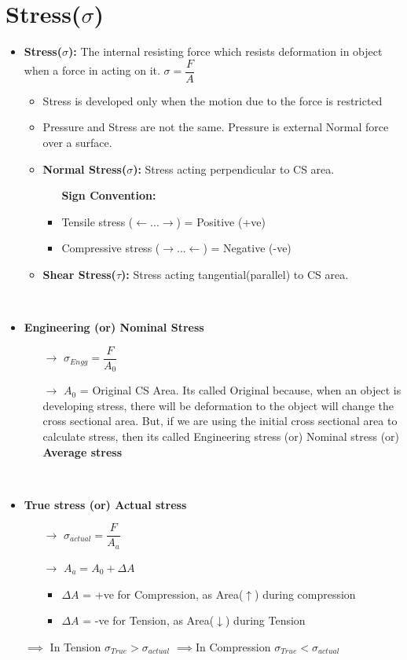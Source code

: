 \documentclass[8pt]{report}
\begin{document}
\section{Stress($\sigma$)}	
	\begin{itemize}
		\item \textbf{Stress($\sigma$): }The internal resisting force which resists deformation in object when a force in acting on it. $\sigma = \dfrac{F}{A}$
		\begin{itemize}
			\item Stress is developed only when the motion due to the force is restricted
			\item Pressure and Stress are not the same. Pressure is external Normal force over a surface. 
			\item \textbf{Normal Stress($\sigma$): }Stress acting perpendicular to CS area.
				\begin{itemize}
					\item[] \textbf{Sign Convention:}
					\item Tensile stress ($\leftarrow\boxed{...}\rightarrow$) = Positive (+ve)
					\item Compressive stress ($\rightarrow\boxed{...}\leftarrow$) = Negative (-ve)
				\end{itemize}
			\item \textbf{Shear Stress($\tau$): }Stress acting tangential(parallel) to CS area.
		\end{itemize}\hrulefill\\
		\item \textbf{Engineering (or) Nominal Stress}
			\begin{itemize}
				\item[$\rightarrow$] $\boxed{\sigma_{Engg}=\dfrac{F}{A_0}}$
				\item[$\rightarrow$] $A_0$ = Original CS Area. Its called Original because, when an object is developing stress, there will be deformation to the object will change the cross sectional area. But, if we are using the initial cross sectional area to calculate stress, then its called Engineering stress (or) Nominal stress (or) \textbf{Average stress}
			\end{itemize}\hrulefill\\
		\item \textbf{True stress (or) Actual stress}
			\begin{itemize}
				\item[$\rightarrow$] $\boxed{\sigma_{actual} = \dfrac{F}{A_a}}$
				\item[$\rightarrow$] $A_a = A_0 + \Delta A$
					\begin{itemize}
						\item $\Delta A$ = +ve for Compression, as Area($\uparrow$) during compression
						\item $\Delta A$ = -ve for Tension, as Area($\downarrow$) during Tension
					\end{itemize}
			\end{itemize}
		\item[$\implies$] In Tension $\boxed{\sigma_{True} > \sigma_{actual}}$  \hspace{1cm}$\implies$In Compression $\boxed{\sigma_{True} < \sigma_{actual}}$ 
	\end{itemize}\hrulefill
\end{document}
